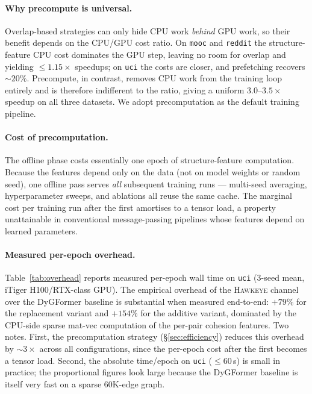 \documentclass[sigconf,nonacm,review]{acmart}
\newcommand{\method}{\textsc{Hawkeye}\xspace}
\begin{document}
\paragraph{Why precompute is universal.}
Overlap-based strategies can only hide CPU work \emph{behind} GPU work, so
their benefit depends on the CPU/GPU cost ratio. On \texttt{mooc} and
\texttt{reddit} the structure-feature CPU cost dominates the GPU step, leaving
no room for overlap and yielding $\le 1.15\times$ speedups; on \texttt{uci}
the costs are closer, and prefetching recovers $\sim 20\%$. Precompute, in
contrast, removes CPU work from the training loop entirely and is therefore
indifferent to the ratio, giving a uniform $3.0$--$3.5\times$ speedup
on all three datasets. We adopt precomputation as the default training
pipeline.

\paragraph{Cost of precomputation.}
The offline phase costs essentially one epoch of structure-feature
computation. Because the features depend only on the data (not on model
weights or random seed), one offline pass serves \emph{all} subsequent
training runs --- multi-seed averaging, hyperparameter sweeps, and ablations
all reuse the same cache. The marginal cost per training run after the first
amortises to a tensor load, a property unattainable in conventional
message-passing pipelines whose features depend on learned parameters.

\paragraph{Measured per-epoch overhead.}
Table~\ref{tab:overhead} reports measured per-epoch wall time on \texttt{uci}
(3-seed mean, iTiger H100/RTX-class GPU). The empirical overhead of the
\method channel over the DyGFormer baseline is substantial when measured
end-to-end: $+79\%$ for the replacement variant and $+154\%$ for the additive
variant, dominated by the CPU-side sparse mat-vec computation of the per-pair
cohesion features. Two notes. First, the precomputation strategy
(\S\ref{sec:efficiency}) reduces this overhead by $\sim 3\times$ across all
configurations, since the per-epoch cost after the first becomes a tensor
load. Second, the absolute time/epoch on \texttt{uci} ($\le 60$\,s) is small
in practice; the proportional figures look large because the DyGFormer
baseline is itself very fast on a sparse 60K-edge graph.
\end{document}
